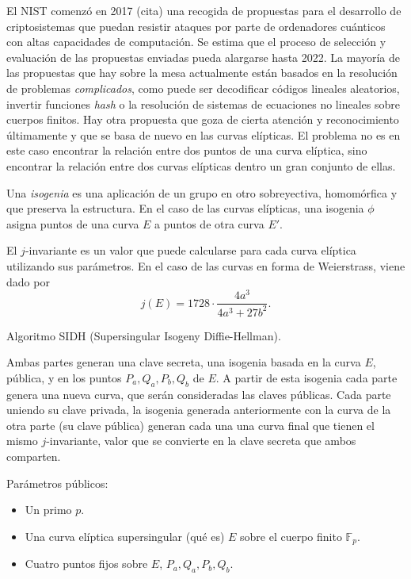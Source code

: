 \documentclass[
  a4paper,
  12pt,
  spanish,
]{scrartcl}
\begin{document}
El NIST comenzó en 2017 (cita) una recogida de propuestas para el desarrollo de criptosistemas que puedan resistir ataques por parte de ordenadores cuánticos con altas capacidades de computación.
Se estima que el proceso de selección y evaluación de las propuestas enviadas pueda alargarse hasta 2022.
La mayoría de las propuestas que hay sobre la mesa actualmente están basados en la resolución de problemas \textit{complicados}, como puede ser decodificar códigos lineales aleatorios, invertir funciones \textit{hash} o la resolución de sistemas de ecuaciones no lineales sobre cuerpos finitos.
Hay otra propuesta que goza de cierta atención y reconocimiento últimamente y que se basa de nuevo en las curvas elípticas.
El problema no es en este caso encontrar la relación entre dos puntos de una curva elíptica, sino encontrar la relación entre dos curvas elípticas dentro un gran conjunto de ellas.


Una \textit{isogenia} es una aplicación de un grupo en otro sobreyectiva, homomórfica y que preserva la estructura.
En el caso de las curvas elípticas, una isogenia \(\phi\) asigna puntos de una curva \(E\) a puntos de otra curva \(E'\).

El \(j\)-invariante es un valor que puede calcularse para cada curva elíptica utilizando sus parámetros. En el caso de las curvas en forma de Weierstrass, viene dado por \[
  j(E) = 1728 \cdot \frac{4a^3}{4a^3 + 27b^2}.
\]

Algoritmo SIDH (Supersingular Isogeny Diffie-Hellman).

Ambas partes generan una clave secreta, una isogenia basada en la curva \(E\), pública, y en los puntos \(P_a, Q_a, P_b, Q_b\) de \(E\). 
A partir de esta isogenia cada parte genera una nueva curva, que serán consideradas las claves públicas.
Cada parte uniendo su clave privada, la isogenia generada anteriormente con la curva de la otra parte (su clave pública) generan cada una una curva final que tienen el mismo \(j\)-invariante, valor que se convierte en la clave secreta que ambos comparten.

Parámetros públicos:

\begin{itemize}
  \item Un primo \(p\).
  \item Una curva elíptica supersingular (qué es) \(E\) sobre el cuerpo finito \(\mathbb F_p\).
  \item Cuatro puntos fijos sobre \(E\), \(P_a, Q_a, P_b, Q_b\).
\end{itemize}
\end{document}
